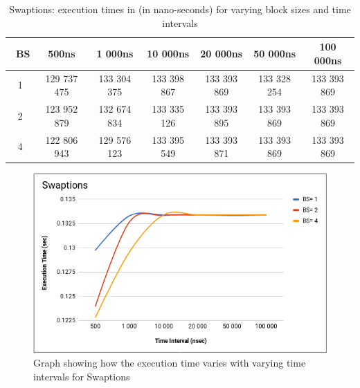 \documentclass{listhesis}
\begin{document}
\begin{table}[h!]
\begin{center}
 \begin{tabular}{|| c | c | c| c | c | c | c||} 
 \hline
 \ \textbf{BS}  & \textbf{500ns}  & \textbf{1 000ns} & \textbf{10 000ns} & \textbf{20 000ns} & \textbf{50 000ns} & \textbf{100 000ns}\\ [0.5 ex] 
 \hline\hline
   1 & 129 737 475 &  133 304 375 & 133 398 867 & 133 393 869 & 133 328 254 &  133 393 869 \\ 
 \hline
   2 & 123 952 879 & 132 674 834 & 133 335 126 & 133 393 895 & 133 393 869 & 133 393 869 \\
 \hline
   4 & 122 806 943 & 129 576 123 & 133 395 549 & 133 393 871 & 133 393 869 & 133 393 869 \\
 \hline
\end{tabular}
 \caption{Swaptions: execution times in (in nano-seconds) for varying block sizes and time intervals}
 \label{table:ExecTimes3}
\end{center}
\end{table}

\begin{figure}
  \includegraphics[width=\linewidth]{Swapt_var_bs_t.png}
  \centering
  \caption{Graph showing how the execution time varies with varying time intervals for Swaptions}
  \label{fig:Swapt_var_bs_t.png}
\end{figure}
\end{document}
